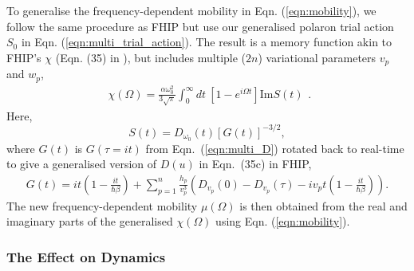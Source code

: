 To generalise the frequency-dependent mobility in Eqn. (\ref{eqn:mobility}), we follow the same procedure as FHIP but use our generalised polaron trial action $S_0$ in Eqn. (\ref{eqn:multi_trial_action}). The result is a memory function akin to FHIP's $\chi$ (Eqn. (35) in \cite{Feynman1962}), but includes multiple ($2n$) variational parameters $v_{p}$ and $w_{p}$,
\begin{equation}\label{eqn:multichi}
    \begin{gathered}
        \chi(\Omega) = \frac{\alpha \omega_0^{2}}{3\sqrt{\pi}} \int_0^{\infty} dt\ \left[1 - e^{i\Omega t}\right] \textrm{Im} S(t)
    \end{gathered} .
\end{equation}
Here, 
\begin{equation}
    S(t) = D_{\omega_0}(t) [G(t)]^{-3/2} ,
\end{equation}
where $G(t)$ is $G(\tau = i t)$ from Eqn.~(\ref{eqn:multi_D}) rotated back to real-time to give a generalised version of $D(u)$ in Eqn.~(35c) in FHIP,
\begin{equation}
    \begin{gathered}
         G(t) = i t  \left(1 - \frac{i t}{\hbar\beta}\right) + \sum_{p=1}^n \frac{h_p}{v_p^3} \left(D_{v_p}(0) - D_{v_p}(\tau) - iv_p t\left(1 - \frac{it}{\hbar\beta} \right) \right).
    \end{gathered}
\end{equation}
The new frequency-dependent mobility $\mu(\Omega)$ is then obtained from the real and imaginary parts of the generalised $\chi(\Omega)$ using Eqn. (\ref{eqn:mobility}).

\subsubsection{The Effect on Dynamics}

